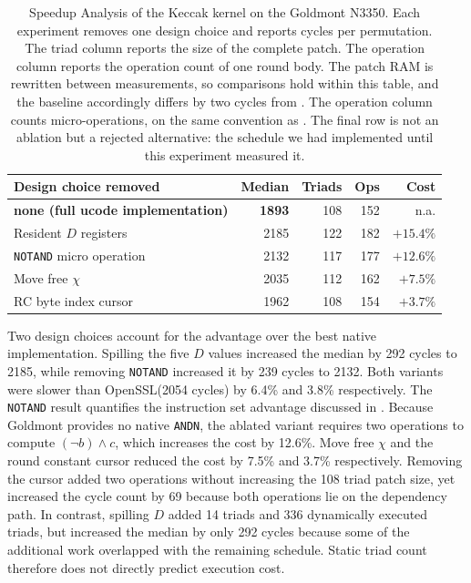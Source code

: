 \documentclass[journal=tches,submission]{iacrtrans}
\newcommand{\code}[1]{\texttt{#1}}
\begin{document}
\begin{table}[htbp]
\centering
\caption{Speedup Analysis of the Keccak kernel on the Goldmont N3350. 
Each experiment removes one design choice and reports cycles per permutation. 
The triad column reports the size of the complete patch. The operation column reports the
operation count of one round body. 
The patch RAM is rewritten between measurements, so comparisons hold within this table, and the
baseline accordingly differs by two cycles from . The operation column
counts micro-operations, on the same convention as . The final row is not an
ablation but a rejected alternative: the schedule we had implemented until this experiment
measured it.}
\label{tab:results-ablation}
\footnotesize
\setlength{\tabcolsep}{4pt}
\begin{tabular}{@{}lrrrr@{}}
\toprule
Design choice removed & Median & Triads & Ops & Cost \\
\midrule
\textbf{none (full ucode implementation)} & \textbf{1893} & 108 & 152 & n.a. \\
\midrule
Resident $D$ registers      & 2185 & 122 & 182 & $+15.4\%$ \\
\code{NOTAND} micro operation & 2132 & 117 & 177 & $+12.6\%$ \\
Move free $\chi$            & 2035 & 112 & 162 & $+7.5\%$  \\
RC byte index cursor        & 1962 & 108 & 154 & $+3.7\%$  \\
\midrule

\end{tabular}
\end{table}

Two design choices account for the advantage over the best native implementation. 
Spilling the five $D$ values increased the median by 292 cycles to 2185, while removing \code{NOTAND} increased it by 239 cycles to 2132. 
Both variants were slower than OpenSSL(2054 cycles) by 6.4\% and 3.8\% respectively. 
The \code{NOTAND} result quantifies the instruction set advantage discussed in . 
Because Goldmont provides no native \code{ANDN}, the ablated variant requires two operations to compute $(\lnot b)\wedge c$, which increases the cost by 12.6\%.
Move free $\chi$ and the round constant cursor reduced the cost by 7.5\% and 3.7\% respectively. 
Removing the cursor added two operations without increasing the 108 triad patch size, yet increased the cycle count by 69 because both operations lie on the dependency path. 
In contrast, spilling $D$ added 14 triads and 336 dynamically executed triads, but increased the median by only 292 cycles because some of the additional work overlapped with the remaining schedule. 
Static triad count therefore does not directly predict execution cost.
\end{document}
